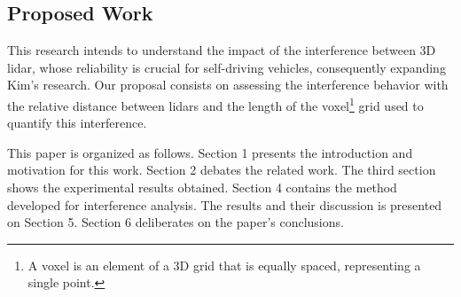 \documentclass[extendedabs]{recpad2k}
\def\etal{\emph{et al}\bmvaOneDot}
\begin{document}
\subsection{Proposed Work}
This research intends to understand the impact of the interference between 3D \gls{lidar}, whose reliability is crucial for self-driving vehicles, consequently expanding Kim's research.
Our proposal consists on assessing the interference behavior with the relative distance between \gls{lidar}s and the length of the voxel\footnote{A voxel is an element of a 3D grid that is equally spaced, representing a single point.} grid used to quantify this interference.

This paper is organized as follows. Section 1 presents the introduction and motivation for this work. Section 2 debates the related work. The third section shows the experimental results obtained. Section 4 contains the method developed for interference analysis. The results and their discussion is presented on Section 5. Section 6 deliberates on the paper's conclusions.





\end{document}
